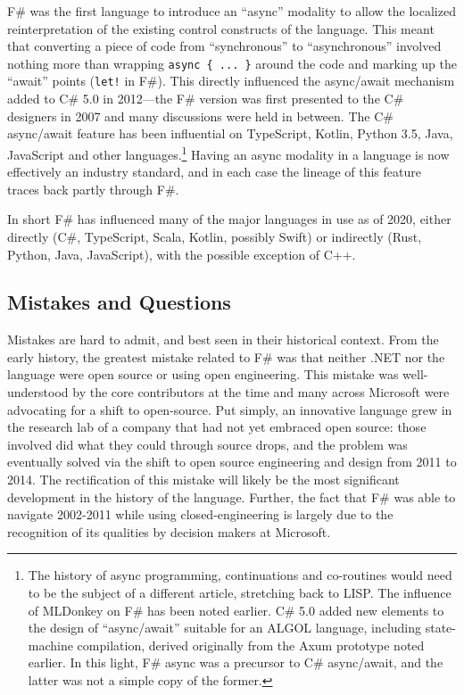 \documentclass[acmsmall,screen]{acmart}
\begin{document}
F\# was the first language to introduce an “async” modality to allow the localized reinterpretation of the existing
control constructs of the language. This meant that converting a piece of code from “synchronous” to
“asynchronous” involved nothing more than wrapping \texttt{async \{ ... \}} around the code and marking up
the “await” points (\texttt{let!} in F\#).   This directly influenced the async/await mechanism added to C\# 5.0 in 2012---the
F\# version was first presented to the C\# designers in 2007 and many discussions were held in
between.  The C\# async/await feature has been influential on TypeScript, Kotlin, Python 3.5, Java, JavaScript and other
languages.\footnote{The history of async programming, continuations and co-routines would need to be the subject
of a different article, stretching back to LISP. The influence of MLDonkey
on F\# has been noted earlier. C\# 5.0 added new elements to the design
of “async/await” suitable for an ALGOL language, including state-machine compilation,
derived originally from the Axum prototype noted earlier.  In this light, F\# async was a
precursor to C\# async/await, and the latter was not a simple copy of the former.}
Having an async modality in a language is now effectively an industry standard, and in each case the lineage of this
feature traces back partly through F\#.

In short F\# has influenced many of the major languages in use as of 2020, either directly (C\#, TypeScript, Scala, Kotlin, possibly Swift) or
indirectly (Rust, Python, Java, JavaScript), with the possible exception of C++.

\subsection*{Mistakes and Questions}

Mistakes are hard to admit, and best seen in their historical context.  From the early history,
the greatest mistake related to F\# was that neither .NET nor the language were open source
or using open engineering.  This mistake was well-understood by the core contributors at the time
and many across Microsoft were advocating for a shift to open-source. Put simply, an innovative language
grew in the research lab of a company that had not yet embraced open source: those involved did
what they could through source drops, and the problem was eventually solved via the shift to open
source engineering and design from 2011 to 2014. The rectification of this mistake will likely be
the most significant development in the history of the language. Further, the fact
that F\# was able to navigate 2002-2011 while using closed-engineering is largely due to the
recognition of its qualities by decision makers at Microsoft.
\end{document}
